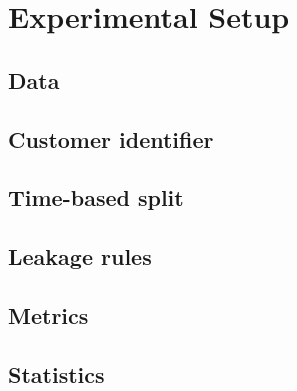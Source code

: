 \section{Experimental Setup}
\label{sec:setup}

\subsection{Data}

\subsection{Customer identifier}

\subsection{Time-based split}

\subsection{Leakage rules}

\subsection{Metrics}

\subsection{Statistics}

